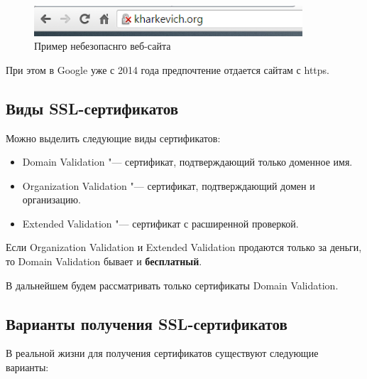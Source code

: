 \documentclass[10pt, a5paper]{article}
\begin{document}
\begin{figure}[h!]
  \centering
  \includegraphics[width=10cm]{w_03_2016_Kharkevich3.png}
\caption*{Пример небезопаснго веб-сайта}\label{fig:Kharkevich3}
\end{figure}


При этом в Google уже с 2014 года предпочтение отдается сайтам с https\footnotemark[3].

\subsection*{Виды SSL-сертификатов}

Можно выделить следующие виды сертификатов:

\begin{itemize}
  \item Domain Validation "--- сертификат, подтверждающий только доменное имя.
  \item Organization Validation "--- сертификат, подтверждающий домен и организацию.
  \item Extended Validation "--- сертификат с расширенной проверкой.
\end{itemize}

Если Organization Validation и Extended Validation продаются только за деньги, то Domain Validation бывает и \textbf{бесплатный}.

В дальнейшем будем рассматривать только сертификаты Domain Validation.

\subsection*{Варианты получения SSL-сертификатов}

В реальной жизни для получения сертификатов существуют следующие варианты:
\end{document}
